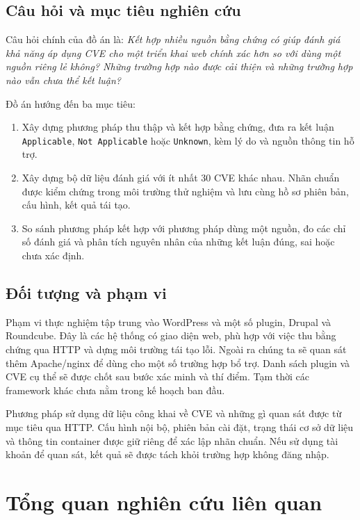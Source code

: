 \documentclass[11pt,a4paper]{article}
\begin{document}
\subsection{Câu hỏi và mục tiêu nghiên cứu}

Câu hỏi chính của đồ án là: \emph{Kết hợp nhiều nguồn bằng chứng có giúp đánh giá khả năng áp dụng CVE cho một triển khai web chính xác hơn so với dùng một nguồn riêng lẻ không? Những trường hợp nào được cải thiện và những trường hợp nào vẫn chưa thể kết luận?}

Đồ án hướng đến ba mục tiêu:
\begin{enumerate}
  \item Xây dựng phương pháp thu thập và kết hợp bằng chứng, đưa ra kết luận \texttt{Applicable}, \texttt{Not Applicable} hoặc \texttt{Unknown}, kèm lý do và nguồn thông tin hỗ trợ.
  \item Xây dựng bộ dữ liệu đánh giá với ít nhất 30 CVE khác nhau. Nhãn chuẩn được kiểm chứng trong môi trường thử nghiệm và lưu cùng hồ sơ phiên bản, cấu hình, kết quả tái tạo.
  \item So sánh phương pháp kết hợp với phương pháp dùng một nguồn, đo các chỉ số đánh giá và phân tích nguyên nhân của những kết luận đúng, sai hoặc chưa xác định.
\end{enumerate}

\subsection{Đối tượng và phạm vi}

Phạm vi thực nghiệm tập trung vào WordPress và một số plugin, Drupal và Roundcube. Đây là các hệ thống có giao diện web, phù hợp với việc thu bằng chứng qua HTTP và dựng môi trường tái tạo lỗi. Ngoài ra chúng ta sẽ quan sát thêm Apache/nginx để dùng cho một số trường hợp bổ trợ. Danh sách plugin và CVE cụ thể sẽ được chốt sau bước xác minh và thí điểm. Tạm thời các framework khác chưa nằm trong kế hoạch ban đầu.

Phương pháp sử dụng dữ liệu công khai về CVE và những gì quan sát được từ mục tiêu qua HTTP. Cấu hình nội bộ, phiên bản cài đặt, trạng thái cơ sở dữ liệu và thông tin container được giữ riêng để xác lập nhãn chuẩn. Nếu sử dụng tài khoản để quan sát, kết quả sẽ được tách khỏi trường hợp không đăng nhập.

\section{Tổng quan nghiên cứu liên quan}
\end{document}
